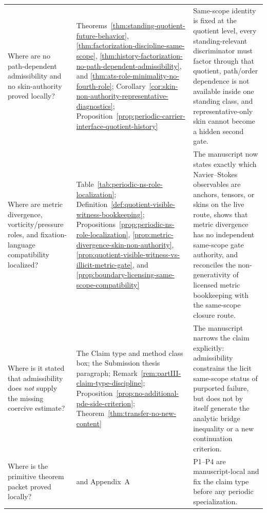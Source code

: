 \begin{tcolorbox}[title={Theorem map for a first audit pass}, colback=blue!2!white, colframe=blue!55!black, boxsep=1pt, left=2pt, right=2pt, top=2pt, bottom=2pt]
\begin{tabularx}{\textwidth}{@{}L{0.28\textwidth}L{0.32\textwidth}Y@{}}
Where are no path-dependent admissibility and no skin-authority proved locally? & Theorems~\ref{thm:standing-quotient-future-behavior}, \ref{thm:factorization-discipline-same-scope}, \ref{thm:history-factorization-no-path-dependent-admissibility}, and \ref{thm:ats-role-minimality-no-fourth-role}; Corollary~\ref{cor:skin-non-authority-representative-diagnostics}; Proposition~\ref{prop:periodic-carrier-interface-quotient-history} & Same-scope identity is fixed at the quotient level, every standing-relevant discriminator must factor through that quotient, path/order dependence is not available inside one standing class, and representative-only skin cannot become a hidden second gate.\\
Where are metric divergence, vorticity/pressure roles, and fixation-language compatibility localized? & Table~\ref{tab:periodic-ns-role-localization}; Definition~\ref{def:quotient-visible-witness-bookkeeping}; Propositions~\ref{prop:periodic-ns-role-localization}, \ref{prop:metric-divergence-skin-non-authority}, \ref{prop:quotient-visible-witness-vs-illicit-metric-gate}, and \ref{prop:boundary-licensing-same-scope-compatibility} & The manuscript now states exactly which Navier--Stokes observables are anchors, tensors, or skins on the live route, shows that metric divergence has no independent same-scope gate authority, and reconciles the non-generativity of licensed metric bookkeeping with the same-scope closure route.\\
Where is it stated that admissibility does \emph{not} supply the missing coercive estimate? & The Claim type and method class box; the Submission thesis paragraph; Remark~\ref{rem:partIII-claim-type-discipline}; Proposition~\ref{prop:no-additional-pde-side-criterion}; Theorem~\ref{thm:transfer-no-new-content} & The manuscript narrows the claim explicitly: admissibility constrains the licit same-scope status of purported failure, but does not by itself generate the analytic bridge inequality or a new continuation criterion.\\
Where is the primitive theorem packet proved locally? & \StructuralPacketRef{} and Appendix~A & P1--P4 are manuscript-local and fix the claim type before any periodic specialization.\\
\bottomrule
\end{tabularx}
\end{tcolorbox}

